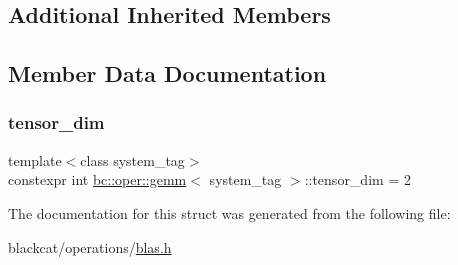 \subsection*{Additional Inherited Members}


\subsection{Member Data Documentation}
\mbox{\label{structbc_1_1oper_1_1gemm_a7dc7c0c3945826526a6c77bd680bd0c1}} 
\subsubsection{\texorpdfstring{tensor\+\_\+dim}{tensor\_dim}}
{\footnotesize\ttfamily template$<$class system\+\_\+tag$>$ \\
constexpr int \hyperlink{structbc_1_1oper_1_1gemm}{bc\+::oper\+::gemm}$<$ system\+\_\+tag $>$\+::tensor\+\_\+dim = 2\hspace{0.3cm}{\ttfamily [static]}}



The documentation for this struct was generated from the following file\+:\begin{DoxyCompactItemize}
\item 
blackcat/operations/\hyperlink{operations_2blas_8h}{blas.\+h}\end{DoxyCompactItemize}
